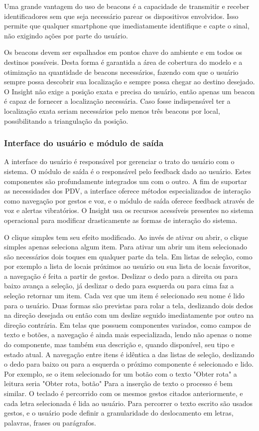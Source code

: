 \documentclass[english,brazilian]{UNISINOSmonografia}
\begin{document}
Uma grande vantagem do uso de beacons é a capacidade de transmitir e receber identificadores sem que seja necessário parear os dispositivos envolvidos. Isso permite que qualquer smartphone que imediatamente identifique e capte o sinal, não exigindo ações por parte do usuário.

Os beacons devem ser espalhados em pontos chave do ambiente e em todos os destinos possíveis. Desta forma é garantida a área de cobertura do modelo e a otimização na quantidade de beacons necessários, fazendo com que o usuário sempre possa descobrir sua localização e sempre possa chegar ao destino desejado. O Insight não exige a posição exata e precisa do usuário, então apenas um beacon é capaz de fornecer a localização necessária. Caso fosse indispensável ter a localização exata seriam necessários pelo menos três beacons por local, possibilitando a triangulação da posição.

	\subsubsection{Interface do usuário e módulo de saída}
A interface do usuário é responsável por gerenciar o trato do usuário com o sistema. O módulo de saída é o responsável pelo feedback dado ao usuário. Estes componentes são profundamente integrados um com o outro. A fim de suportar as necessidades dos PDV, a interface oferece métodos especializados de interação como navegação por gestos e voz, e o módulo de saída oferece feedback através de voz e alertas vibratórios. 
O Insight usa os recursos acessíveis presentes no sistema operacional para modificar drasticamente as formas de interação do sistema. 

O clique simples tem seu efeito modificado. Ao invés de ativar ou abrir, o clique simples apenas seleciona algum item. Para ativar um abrir um item selecionado são necessários dois toques em qualquer parte da tela. Em listas de seleção, como por exemplo a lista de locais próximos ao usuário ou sua lista de locais favoritos, a navegação é feita a partir de gestos. Deslizar o dedo para a direita ou para baixo avança a seleção, já deslizar o dedo para esquerda ou para cima faz a seleção retornar um item. Cada vez que um item é selecionado seu nome é lido para o usuário. Duas formas são previstas para rolar a tela, deslizando dois dedos na direção desejada ou então com um deslize seguido imediatamente por outro na direção contrária. Em telas que possuem componentes variados, como campos de texto e botões, a navegação é ainda mais especializada, lendo não apenas o nome do componente, mas também sua descrição e, quando disponível, seu tipo e estado atual. A navegação entre itens é idêntica a das listas de seleção, deslizando o dedo para baixo ou para a esquerda o próximo componente é selecionado e lido. Por exemplo, se o item selecionado for um botão com o texto "Obter rota" a leitura seria "Obter rota, botão"
Para a inserção de texto o processo é bem similar. O teclado é percorrido com os mesmos gestos citados anteriormente, e cada letra selecionada é lida ao usuário. Para percorrer o texto escrito são usados gestos, e o usuário pode definir a granularidade do deslocamento em letras, palavras, frases ou parágrafos.
\end{document}
